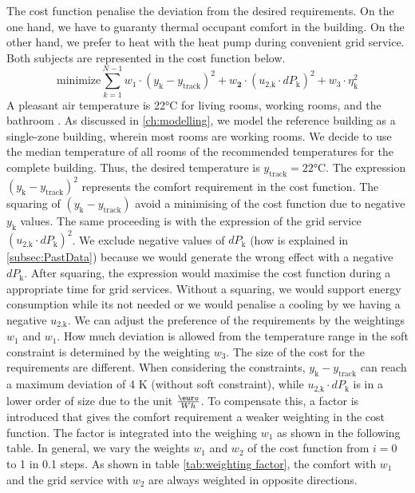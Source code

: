 The cost function penalise the deviation from the desired requirements. On the one hand, we have to guaranty thermal occupant comfort in the building. On the other hand, we prefer to heat with the heat pump during convenient grid service. Both subjects are represented in the cost function below.
    \begin{equation}
        \text{minimize} \sum_{k=1}^{N-1} w_\text{1}\cdot (y_\text{k}-y_\text{track})^2 + w_\textbf{2}\cdot(u_\text{2,k}\cdot dP_\text{k})^2 + w_\text{3} \cdot \eta_\text{k}^2
        \label{eq:costfunctatsächlich}
    \end{equation}
A pleasant air temperature is 22°C for living rooms, working rooms, and the bathroom \cite{Umweltbundesamt.7.10.2021}. As discussed in \autoref{ch:modelling}, we model the reference building as a single-zone building, wherein most rooms are working rooms. We decide to use the median temperature of all rooms of the recommended temperatures for the complete building. Thus, the desired temperature is $y_\text{track} = 22$°C.\newline
The expression $(y_\text{k}-y_\text{track})^2$ represents the comfort requirement in the cost function. The squaring of $(y_\text{k}-y_\text{track})$ avoid a minimising of the cost function due to negative $y_\text{k}$ values. The same proceeding is with the expression of the grid service $(u_\text{2,k}\cdot dP_\text{k})^2$. We exclude negative values of $dP_\text{k}$ (how is explained in \autoref{subsec:PastData}) because we would generate the wrong effect with a negative $dP_\text{k}$. After squaring, the expression would maximise the cost function during a appropriate time for grid services. Without a squaring, we would support energy consumption while its not needed or we would penalise a cooling by we having a negative $u_\text{2,k}$.\newline
We can adjust the preference of the requirements by the weightings $w_\text{1}$ and $w_\text{1}$. How much deviation is allowed from the temperature range in the soft constraint is determined by the weighting $w_\text{3}$.\newline
The size of the cost for the requirements are different. When considering the constraints, $y_\text{k}-y_\text{track}$ can reach a maximum deviation of 4 K (without soft constraint), while $u_\text{2,k}\cdot dP_\text{k}$ is in a lower order of size due to the unit $\frac{\text{\euro}}{Wh}$. To compensate this, a factor is introduced that gives the comfort requirement a weaker weighting in the cost function. The factor is integrated into the weighing $w_\text{1}$ as shown in the following table. In general, we vary the weights $w_\text{1}$ and $w_\text{2}$ of the cost function from $ i= 0$ to 1 in 0.1 steps. As shown in table \autoref{tab:weighting factor}, the comfort with $w_\text{1}$ and the grid service with $w_\text{2}$ are always weighted in opposite directions.\newline
